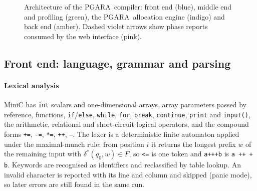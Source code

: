 \documentclass[conference]{IEEEtran}
\newcommand{\MG}{PGARA}
\newcommand{\tm}[1]{\texttt{#1}}
\begin{document}
\begin{figure}[!t]
\caption{Architecture of the \MG\ compiler: front end (blue), middle
end and profiling (green), the \MG\ allocation engine (indigo) and back
end (amber). Dashed violet arrows show phase reports consumed by the web
interface (pink).}
\label{fig:arch}
\end{figure}

\subsection{Front end: language, grammar and parsing}

\paragraph*{Lexical analysis}
MiniC has \tm{int} scalars and one-dimensional arrays, array parameters
passed by reference, functions, \tm{if}/\tm{else}, \tm{while},
\tm{for}, \tm{break}, \tm{continue}, \tm{print} and \tm{input()}, the
arithmetic, relational and short-circuit logical operators, and the
compound forms \tm{+=}, \tm{-=}, \tm{*=}, \tm{++}, \tm{--}. The lexer is
a deterministic finite automaton applied under the maximal-munch rule:
from position $i$ it returns the longest prefix $w$ of the remaining
input with $\delta^\ast(q_0,w)\in F$, so \tm{<=} is one token and
\tm{a+++b} is \tm{a ++ + b}. Keywords are recognised as identifiers and
reclassified by table lookup. An invalid character is reported with its
line and column and skipped (panic mode), so later errors are still
found in the same run.
\end{document}
